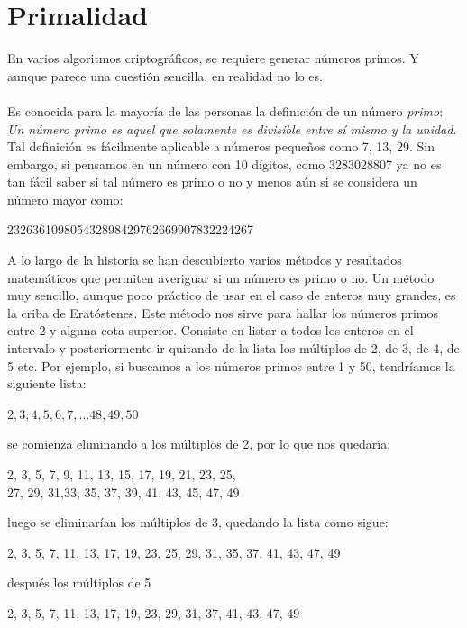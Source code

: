 \section{Primalidad}
En varios algoritmos criptogr\'aficos, se requiere generar n\'umeros
primos. Y aunque parece una cuesti\'on sencilla, en realidad no lo es. 
\\ \\
Es conocida para la mayor\'ia de las personas la definici\'on de un n\'umero {\it primo}: {\it Un n\'umero 
primo es aquel que solamente es divisible entre s\'i mismo y la unidad}. Tal definici\'on es f\'acilmente
aplicable a n\'umeros peque\~nos como 7, 13, 29. Sin embargo, si pensamos en un n\'umero con 10 d\'igitos, como 3283028807 ya no es tan f\'acil saber si tal n\'umero es primo
o no y menos a\'un si se considera un n\'umero mayor como:
\begin{center}
232636109805432898429762669907832224267 \\
\end{center}
A lo largo de la historia se han descubierto varios m\'etodos y resultados matem\'aticos que permiten
averiguar si un n\'umero es primo o no. Un m\'etodo muy sencillo, aunque poco pr\'actico de usar en el
caso de enteros muy grandes, es la criba de Erat\'ostenes. Este m\'etodo nos sirve para hallar los n\'umeros 
primos entre 2 y alguna cota superior. Consiste en listar a todos los enteros en el intervalo y posteriormente
ir quitando de la lista los m\'ultiplos de 2, de 3, de 4, de 5 etc. Por ejemplo, si buscamos a los n\'umeros 
primos entre 1 y 50, tendr\'iamos la siguiente lista:
\begin{center}
$2, 3, 4, 5, 6, 7, \ldots  48, 49, 50  $ \\
\end{center}
se comienza eliminando a los m\'ultiplos de 2, por lo que nos quedar\'ia:
\begin{center}
2, 3, 5, 7, 9, 11, 13, 15, 17, 19, 21, 23, 25, \\
27, 29, 31,33, 35, 37, 39, 41, 43, 45, 47, 49\\
\end{center}
luego se eliminar\'ian los m\'ultiplos de 3, quedando la lista como sigue:
\begin{center}
2, 3, 5, 7, 11, 13, 17, 19, 23, 25, 29, 31, 35, 37, 41, 43, 47, 49
\end{center}
despu\'es los m\'ultiplos de 5
\begin{center}
2, 3, 5, 7, 11, 13, 17, 19, 23, 29, 31, 37, 41, 43, 47, 49 \\
\end{center}
